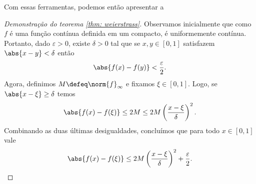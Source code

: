 Com essas ferramentas, podemos então apresentar a
 \begin{proof}[Demonstração do teorema \ref{thm: weierstrass}]
    Observamos inicialmente que como \( f \) é uma função contínua definida em um compacto, é uniformemente contínua.
    Portanto, dado \( \varepsilon > 0 \), existe \( \delta > 0 \) tal que se \( x, y \in [0, 1] \) satisfazem \( \abs{ x - y } < \delta \) então \[
        \abs{ f(x) - f(y) } < \frac{ \varepsilon }{ 2 }
    .\]
    Agora, definimos \( M \defeq \norm{ f }_{ \infty } \) e fixamos \( \xi \in [0, 1] \).
    Logo, se \( \abs{ x - \xi } \geq \delta \) temos \[
        \abs{ f(x) - f(\xi) } \leq 2M \leq 2M \left( \frac{ x - \xi }{ \delta } \right)^2
    .\]
    Combinando as duas últimas desigualdades, concluímos que para todo \( x \in [0, 1] \) vale
    \begin{equation}
        \abs{ f(x) - f(\xi) } \leq 2M \left( \frac{ x - \xi }{ \delta } \right)^2 + \frac{ \varepsilon }{ 2 }
        \label{eq: weierstrass_bound_1}
    .\end{equation}


\end{proof}
